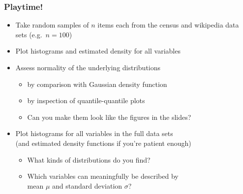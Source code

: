 \documentclass[t]{beamer} %
\begin{document}
\begin{frame}
  \frametitle{Playtime!}
  \begin{itemize}
  \item Take random samples of $n$ items each from the census and wikipedia
    data sets (e.g.\ $n=100$)
    \begin{center}
    \end{center}
  \item Plot histograms and estimated density for all variables
  \item Assess normality of the underlying distributions
    \begin{itemize}
    \item by comparison with Gaussian density function
    \item by inspection of quantile-quantile plots
    \item[\hand] Can you make them look like the figures in the slides?
    \end{itemize}
  \item Plot histograms for all variables in the full data sets\\
    (and estimated density functions if you're patient enough)
    \begin{itemize}
    \item What kinds of distributions do you find?
    \item Which variables can meaningfully be described by\\
      mean $\mu$ and standard deviation $\sigma$?
    \end{itemize}
  \end{itemize}
\end{frame}


\end{document}
